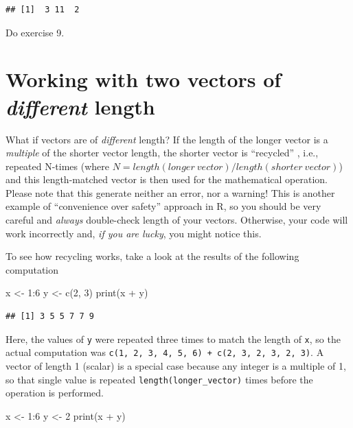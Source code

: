 \documentclass[
]{book}
\newenvironment{Shaded}{\begin{snugshade}}{\end{snugshade}}
\newcommand{\DecValTok}[1]{\textcolor[rgb]{0.00,0.00,0.81}{#1}}
\newcommand{\FunctionTok}[1]{\textcolor[rgb]{0.00,0.00,0.00}{#1}}
\newcommand{\NormalTok}[1]{#1}
\newcommand{\OtherTok}[1]{\textcolor[rgb]{0.56,0.35,0.01}{#1}}
\newcommand{\SpecialCharTok}[1]{\textcolor[rgb]{0.00,0.00,0.00}{#1}}
\begin{document}
\begin{verbatim}
## [1]  3 11  2
\end{verbatim}

Do exercise 9.

\hypertarget{different-length-vectors}{%
\section{\texorpdfstring{Working with two vectors of \emph{different} length}{Working with two vectors of different length}}\label{different-length-vectors}}

What if vectors are of \emph{different} length? If the length of the longer vector is a \emph{multiple} of the shorter vector length, the shorter vector is ``recycled'' , i.e., repeated N-times (where \(N = length(longer~vector) / length(shorter~vector)\)) and this length-matched vector is then used for the mathematical operation. Please note that this generate neither an error, nor a warning! This is another example of ``convenience over safety'' approach in R, so you should be very careful and \emph{always} double-check length of your vectors. Otherwise, your code will work incorrectly and, \emph{if you are lucky}, you might notice this.

To see how recycling works, take a look at the results of the following computation

\begin{Shaded}
\begin{Highlighting}[]
\NormalTok{x }\OtherTok{\textless{}{-}} \DecValTok{1}\SpecialCharTok{:}\DecValTok{6}
\NormalTok{y }\OtherTok{\textless{}{-}} \FunctionTok{c}\NormalTok{(}\DecValTok{2}\NormalTok{, }\DecValTok{3}\NormalTok{)}
\FunctionTok{print}\NormalTok{(x }\SpecialCharTok{+}\NormalTok{ y)}
\end{Highlighting}
\end{Shaded}

\begin{verbatim}
## [1] 3 5 5 7 7 9
\end{verbatim}

Here, the values of \texttt{y} were repeated three times to match the length of \texttt{x}, so the actual computation was \texttt{c(1,\ 2,\ 3,\ 4,\ 5,\ 6)\ +\ c(2,\ 3,\ 2,\ 3,\ 2,\ 3)}. A vector of length 1 (scalar) is a special case because any integer is a multiple of 1, so that single value is repeated \texttt{length(longer\_vector)} times before the operation is performed.

\begin{Shaded}
\begin{Highlighting}[]
\NormalTok{x }\OtherTok{\textless{}{-}} \DecValTok{1}\SpecialCharTok{:}\DecValTok{6}
\NormalTok{y }\OtherTok{\textless{}{-}} \DecValTok{2}
\FunctionTok{print}\NormalTok{(x }\SpecialCharTok{+}\NormalTok{ y)}
\end{Highlighting}
\end{Shaded}
\end{document}
